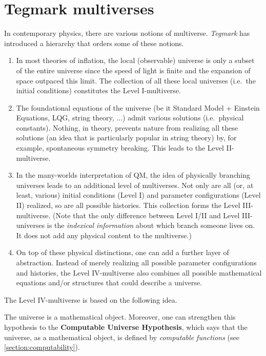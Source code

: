 
\section{Tegmark multiverses}

    In contemporary physics, there are various notions of multiverse. \textit{Tegmark} has introduced a hierarchy that orders some of these notions.

    \begin{enumerate}
        \item In most theories of inflation, the local (observable) universe is only a subset of the entire universe since the speed of light is finite and the expansion of space outpaced this limit. The collection of all these local universes (i.e.~the initial conditions) constitutes the Level I-multiverse.
        \item The foundational equations of the universe (be it Standard Model + Einstein Equations, LQG, string theory, ...) admit various solutions (i.e.~physical constants). Nothing, in theory, prevents nature from realizing all these solutions (an idea that is particularly popular in string theory) by, for example, spontaneous symmetry breaking. This leads to the Level II-multiverse.
        \item In the many-worlds interpretation of QM, the idea of physically branching universes leads to an additional level of multiverses. Not only are all (or, at least, various) initial conditions (Level I) and parameter configurations (Level II) realized, so are all possible histories. This collection forms the Level III-multiverse. (Note that the only difference between Level I/II and Level III-universes is the \textit{indexical information} about which branch someone lives on. It does not add any physical content to the multiverse.)
        \item On top of these physical distinctions, one can add a further layer of abstraction. Instead of merely realizing all possible parameter configurations and histories, the Level IV-multiverse also combines all possible mathematical equations and/or structures that could describe a universe.
    \end{enumerate}

    The Level IV-multiverse is based on the following idea.
    \begin{axiom}
        The universe is a mathematical object. Moreover, one can strengthen this hypothesis to the \textbf{Computable Universe Hypothesis}, which says that the universe, as a mathematical object, is defined by \textit{computable functions} (see \cref{section:computability}).
    \end{axiom}